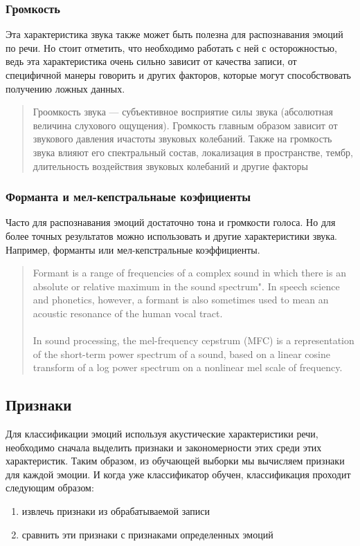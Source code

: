 \documentclass[14pt]{extarticle}
\begin{document}
\subsubsection{Громкость}
Эта характеристика звука также может быть полезна для распознавания эмоций по речи. Но стоит отметить, что необходимо работать с ней с осторожностью, ведь эта характеристика очень сильно зависит от качества записи, от специфичной манеры говорить и других факторов, которые могут способствовать получению ложных данных.
\begin{quote}
Гроомкость звука — субъективное восприятие силы звука (абсолютная величина слухового ощущения). Громкость главным образом зависит от звукового давления ичастоты звуковых колебаний. Также на громкость звука влияют его спектральный состав, локализация в пространстве, тембр, длительность воздействия звуковых колебаний и другие факторы \cite{wiki_loudness}
\end{quote}

\subsubsection{Форманта и мел-кепстральнаые коэфициенты}
Часто для распознавания эмоций достаточно тона и громкости голоса. Но для более точных результатов можно использовать и другие характеристики звука. Например, форманты или мел-кепстральные коэффициенты. 
\begin{quote}
Formant is a range of frequencies of a complex sound in which there is an absolute or relative maximum in the sound spectrum". In speech science and phonetics, however, a formant is also sometimes used to mean an acoustic resonance of the human vocal tract.\cite{wiki2}
\\
\\
In sound processing, the mel-frequency cepstrum (MFC) is a representation of the short-term power spectrum of a sound, based on a linear cosine transform of a log power spectrum on a nonlinear mel scale of frequency\cite{wiki3}.
\end{quote}


\subsection{Признаки}
Для классификации эмоций используя акустические характеристики речи, необходимо сначала выделить признаки и закономерности этих среди этих характеристик. Таким образом, из обучающей выборки мы вычисляем признаки для каждой эмоции. И когда уже классификатор обучен, классификация проходит следующим образом:
\begin{enumerate}
	\item извлечь признаки из обрабатываемой записи
	\item сравнить эти признаки с признаками определенных эмоций
\end{enumerate}
\end{document}
